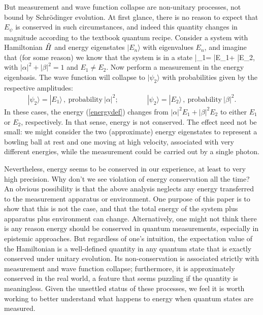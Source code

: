 \documentclass[aps,prd,onecolumn,nofootinbib,notitlepage]{revtex4-1}
\begin{document}
But measurement and wave function collapse are non-unitary processes, not bound by Schr\"odinger evolution.
At first glance, there is no reason to expect that $E_\psi$ is conserved in such circumstances, and indeed this quantity changes in magnitude according to the textbook quantum recipe.
Consider a system with Hamiltonian $\hat{H}$ and energy eigenstates $|E_n\rangle$ with eigenvalues $E_n$, and imagine that (for some reason) we know that the system is in a state
\be
  |\psi_1\rangle = \alpha |E_1\rangle + \beta |E_2\rangle,
  \label{energysuperposition}
\ee
with $|\alpha|^2+|\beta|^2 = 1$ and $E_1\neq E_2$.
Now perform a measurement in the energy eigenbasis.
The wave function will collapse to $|\psi_2\rangle$ with probabilities given by the respective amplitudes:
\begin{align}
  |\psi_2\rangle = |E_1\rangle\,, \  \mathrm{probability\ }|\alpha|^2;\qquad \qquad 
  |\psi_2\rangle = |E_2\rangle\,,\  \mathrm{probability\ }|\beta|^2.
\end{align}
In these cases, the energy (\ref{energydef}) changes from $|\alpha|^2 E_1 + |\beta|^2 E_2$ to either $E_1$ or $E_2$, respectively. 
In that sense, energy is not conserved.
The effect need not be small: we might consider the two (approximate) energy eigenstates to represent a bowling ball at rest and one moving at high velocity, associated with very different energies, while the measurement could be carried out by a single photon.

Nevertheless, energy seems to be conserved in our experience, at least to very high precision. 
Why don't we see violation of energy conservation all the time? 
An obvious possibility is that the above analysis neglects any energy transferred to the measurement apparatus or environment. 
One purpose of this paper is to show that this is not the case, and that the total energy of the system plus apparatus plus environment can change.
Alternatively, one might not think there is any reason energy should be conserved in quantum measurements, especially in epistemic approaches.
But regardless of one's intuition, the expectation value of the Hamiltonian is a well-defined quantity in any quantum state that is exactly conserved under unitary evolution.
Its non-conservation is associated strictly with measurement and wave function collapse; furthermore, it is approximately conserved in the real world, a feature that seems puzzling if the quantity is meaningless.
Given the unsettled status of these processes, we feel it is worth working to better understand what happens to energy when quantum states are measured.
\end{document}
